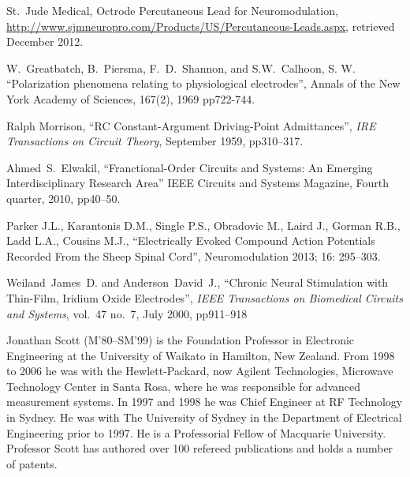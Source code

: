\documentclass[journal, a4paper]{IEEEtran}
\begin{document}
{\begin{thebibliography}{99}
St.~Jude Medical, Octrode Percutaneous Lead for Neuromodulation,
\url{http://www.sjmneuropro.com/Products/US/Percutaneous-Leads.aspx},
retrieved December 2012.

W.~Greatbatch, B.~Piersma, F.~D.~Shannon, and S.W.~Calhoon, S. W.
``Polarization phenomena relating to physiological electrodes'',
Annals of the New York Academy of Sciences,
167(2), 1969 pp722-744.

Ralph Morrison,
``RC Constant-Argument Driving-Point Admittances'',
{\em IRE Transactions on Circuit Theory},
September 1959, pp310--317.

Ahmed~S.~Elwakil,
``Franctional-Order Circuits and Systems: An Emerging Interdisciplinary Research Area''
IEEE Circuits and Systems Magazine, Fourth quarter, 2010, pp40--50.

Parker J.L., Karantonis D.M., Single P.S., Obradovic M., Laird J., Gorman R.B., Ladd L.A., Cousins M.J.,
``Electrically Evoked Compound Action Potentials Recorded From the Sheep Spinal Cord'',
Neuromodulation 2013; 16: 295--303.


Weiland~James~D. and Anderson~David~J.,
``Chronic Neural Stimulation with Thin-Film, Iridium Oxide Electrodes'',
{\em IEEE Transactions on Biomedical Circuits and Systems},
vol.~47 no.~7, July 2000, pp911--918




\end{thebibliography}


\begin{IEEEbiography}{Jonathan Scott}
(M'80--SM'99) is the Foundation Professor in
Electronic Engineering at the University of Waikato in Hamilton, New
Zealand.  From 1998 to 2006 he was with the Hewlett-Packard,
now Agilent Technologies, Microwave Technology Center in Santa Rosa,
where he was responsible for advanced measurement systems.  In 1997 and
1998 he was Chief Engineer at RF Technology in Sydney.  He was with The
University of Sydney in the Department of Electrical Engineering prior
to 1997.  He is a Professorial Fellow of Macquarie
University.  Professor Scott has authored over 100 refereed
publications and holds a number of patents.
\end{IEEEbiography}


}
\end{document}
